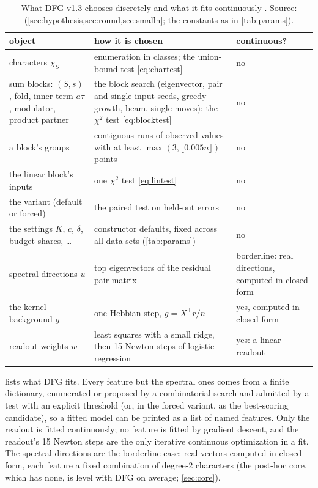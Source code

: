 \begin{table}[t]
\centering\footnotesize\renewcommand{\arraystretch}{1.15}
\begin{tabularx}{\linewidth}{>{\raggedright\arraybackslash}p{4.1cm}>{\raggedright\arraybackslash}X>{\raggedright\arraybackslash}p{3.0cm}}
\toprule
object & how it is chosen & continuous?\\
\midrule
characters $\chi_S$ & enumeration in classes; the union-bound test \eqref{eq:chartest} & no\\
sum blocks: $(S,s)$, fold, inner term $a\tau$, modulator, product partner & the block search (eigenvector, pair and single-input seeds, greedy growth, beam, single moves); the $\chi^2$ test \eqref{eq:blocktest} & no\\
a block's groups & contiguous runs of observed values with at least $\max(3,\lfloor0.005n\rfloor)$ points & no\\
the linear block's inputs & one $\chi^2$ test \eqref{eq:lintest} & no\\
the variant (default or forced) & the paired test on held-out errors & no\\
the settings $K$, $c$, $\delta$, budget shares, \dots & constructor defaults, fixed across all data sets (\cref{tab:params}) & no\\
spectral directions $u$ & top eigenvectors of the residual pair matrix & borderline: real directions, computed in closed form\\
the kernel background $g$ & one Hebbian step, $g=X^\top r/n$ & yes, computed in closed form\\
readout weights $w$ & least squares with a small ridge, then 15 Newton steps of logistic regression & yes: a linear readout\\
\bottomrule
\end{tabularx}
\caption{What DFG v1.3 chooses discretely and what it fits continuously . Source:  (\cref{sec:hypothesis,sec:round,sec:smalln}; the constants as in \cref{tab:params}).}
\label{tab:discrete}
\end{table}

 lists what DFG fits. Every feature but the spectral ones comes from a finite dictionary, enumerated or proposed by a combinatorial search and admitted by a test with an explicit threshold (or, in the forced variant, as the best-scoring candidate), so a fitted model can be printed as a list of named features. Only the readout is fitted continuously; no feature is fitted by gradient descent, and the readout's 15 Newton steps are the only iterative continuous optimization in a fit. The spectral directions are the borderline case: real vectors computed in closed form, each feature a fixed combination of degree-2 characters (the post-hoc core, which has none, is level with DFG on average; \cref{sec:core}).
